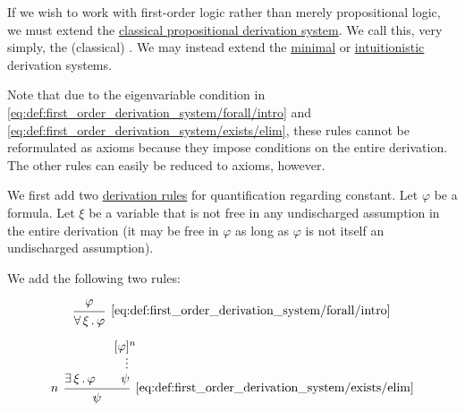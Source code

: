 \begin{definition}\label{def:first_order_derivation_system}
  If we wish to work with first-order logic rather than merely propositional logic, we must extend the \hyperref[def:propositional_derivation_system]{classical propositional derivation system}. We call this, very simply, the (classical) . We may instead extend the \hyperref[def:minimal_propositional_derivation_system]{minimal} or \hyperref[def:intuitionistic_propositional_derivation_system]{intuitionistic} derivation systems.

  Note that due to the eigenvariable condition in \eqref{eq:def:first_order_derivation_system/forall/intro} and \eqref{eq:def:first_order_derivation_system/exists/elim}, these rules cannot be reformulated as axioms because they impose conditions on the entire derivation. The other rules can easily be reduced to axioms, however.

  \begin{thmenum}
     We first add two \hyperref[def:proof_derivation_system/rules]{derivation rules} for quantification regarding constant. Let \( \varphi \) be a formula. Let \( \xi \) be a variable that is not free in any undischarged assumption in the entire derivation (it may be free in \( \varphi \) as long as \( \varphi \) is not itself an undischarged assumption).

    We add the following two rules:

    \begin{minipage}{0.45\textwidth}
      \begin{equation*}\taglabel[\textrm{R} \( \forall^+ \)]{eq:def:first_order_derivation_system/forall/intro}
        \begin{prooftree}
          \hypo{ \varphi }
          \infer1[\ref{eq:def:first_order_derivation_system/forall/intro}]{ \qforall \xi \varphi }
        \end{prooftree}
      \end{equation*}
    \end{minipage}
    \hfill
    \begin{minipage}{0.45\textwidth}
      \begin{equation*}\taglabel[\textrm{R} \( \exists^- \)]{eq:def:first_order_derivation_system/exists/elim}
        \begin{prooftree}
          \hypo{ \qexists \xi \varphi }
          \hypo{ [\varphi]^n }
          \ellipsis {} { \psi }
          \infer[left label=\( n \)]2[\ref{eq:def:first_order_derivation_system/exists/elim}]{ \psi }
        \end{prooftree}
      \end{equation*}
    \end{minipage}


\end{thmenum}
\end{definition}

